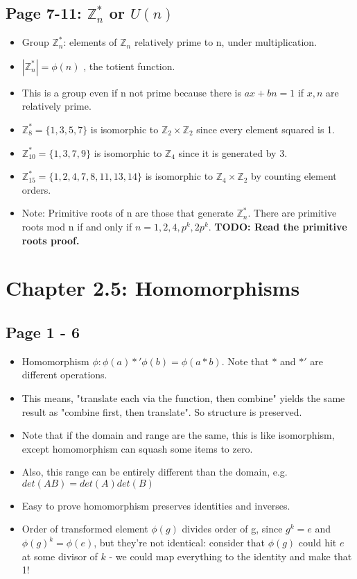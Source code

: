 \documentclass[11pt, oneside]{article}   	%
\begin{document}
\subsection{Page 7-11: $\mathbb{Z}_n^*$ or $U(n)$}
\begin{itemize}
\item Group $\mathbb{Z}_n^*$: elements of $\mathbb{Z}_n$ relatively prime to n, under multiplication. 
\item $|\mathbb{Z}_n^*| = \phi(n)$ , the totient function.
\item This is a group even if n not prime because there is $ax + bn = 1$  if $x, n$ are relatively prime.
\item $\mathbb{Z}_8^* = \{1,3,5,7\}$ is isomorphic to $\mathbb{Z}_2  \times \mathbb{Z}_2$ since every element squared is 1.
\item $\mathbb{Z}_{10}^* = \{1,3,7,9\}$ is isomorphic to $\mathbb{Z}_4$ since it is generated by 3.
\item $\mathbb{Z}_{15}^* = \{1,2,4,7,8,11,13,14\}$ is isomorphic to $\mathbb{Z}_4 \times \mathbb{Z}_2$ by counting element orders.
\item Note: Primitive roots of n are those that generate $\mathbb{Z}_n^*$.  There are primitive roots mod n if and only if $n = 1,2,4,p^k, 2p^k$.  \textbf{TODO: Read the primitive roots proof.}
\end{itemize}

\section {Chapter 2.5: Homomorphisms}
\subsection{Page 1 - 6}
\begin{itemize}
\item Homomorphism $\phi: \phi(a) *' \phi(b) = \phi(a * b)$.  Note that  $*$ and $*'$ are different  operations.
\item This means, "translate each via the function, then combine" yields the same result as "combine first, then translate".  So structure is preserved.
\item Note that if the domain and range are the same, this is like isomorphism, except homomorphism can squash some items to zero.
\item Also, this range can be entirely different than the domain, e.g. $det(AB) = det(A)det(B)$
\item Easy to prove homomorphism preserves identities and inverses.
\item Order of transformed element $\phi(g)$ divides order of g, since $g^k = e$ and $\phi(g)^k = \phi(e)$, but they're not identical: consider that $\phi(g)$ could hit $e$ at some divisor of $k$ - we could map everything to the identity and make that 1!
\end{itemize}
\end{document}
